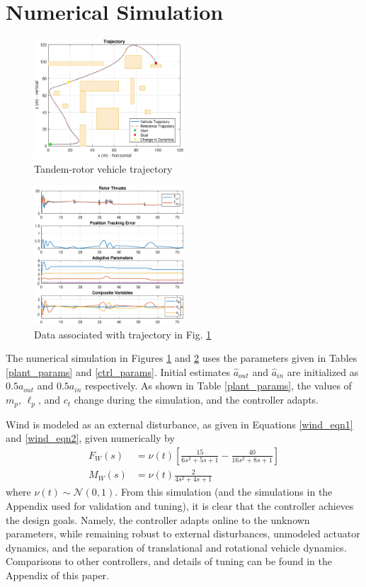 \documentclass[letterpaper, 10 pt, conference]{ieeeconf}\usepackage[margin=1in]{geometry}
\begin{document}
\section{Numerical Simulation}
\begin{figure}
	\centering
	\includegraphics[width=0.5\textwidth]{traj2}
	\caption{Tandem-rotor vehicle trajectory}
	\label{traj1}
\end{figure}
\begin{figure}[thbp!]
	\centering
	\includegraphics[width=0.5\textwidth]{data3}
	\caption{Data associated with trajectory in Fig. \ref{traj1}}
	\label{data1}
\end{figure}
 
The numerical simulation in Figures \ref{traj1} and \ref{data1} uses the parameters given in Tables \ref{plant_params} and \ref{ctrl_params}. Initial estimates $\hat{a}_{out}$ and $\hat{a}_{in}$ are initialized as $0.5 a_{out}$ and $0.5 a_{in}$ respectively. As shown in Table \ref{plant_params}, the values of $m_p$, $\ell_p$, and $c_t$ change during the simulation, and the controller adapts.

Wind is modeled as an external disturbance, as given in Equations \ref{wind_eqn1} and \ref{wind_eqn2}, given numerically by \small
\begin{align}
	F_W(s) &= \nu(t) \left[ \frac{15}{6s^2 + 5s + 1} - \frac{40}{16s^2 + 8s + 1} \right] \\
	M_W(s) &= \nu(t) \frac{2}{4s^2 + 4s + 1}
\end{align} \normalsize
where $\nu(t) \sim \mathcal{N}(0,1)$. From this simulation (and the simulations in the Appendix used for validation and tuning), it is clear that the controller achieves the design goals. Namely, the controller adapts online to the unknown parameters, while remaining robust to external disturbances, unmodeled actuator dynamics, and the separation of translational and rotational vehicle dynamics. Comparisons to other controllers, and details of tuning can be found in the Appendix of this paper.
\end{document}
